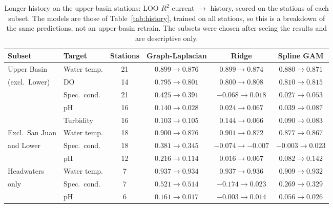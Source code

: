 \documentclass[11pt]{article}
\begin{document}
\begin{table}[h]
\centering
\small
\caption{Longer history on the upper-basin stations: LOO $R^2$ current $\to$ history, scored on the
stations of each subset. The models are those of Table~\ref{tab:history}, trained on all stations,
so this is a breakdown of the same predictions, not an upper-basin retrain. The subsets were chosen
after seeing the results and are descriptive only.}
\label{tab:history_region}
\begin{tabular}{ll c ccc}
\toprule
Subset & Target & Stations & Graph-Laplacian & Ridge & Spline GAM \\
\midrule
Upper Basin     & Water temp.  & 21 & $0.899\to0.876$ & $0.899\to0.874$ & $0.880\to0.871$ \\
(excl.\ Lower)  & DO           & 14 & $0.795\to0.801$ & $0.800\to0.808$ & $0.810\to0.815$ \\
                & Spec.\ cond. & 21 & $\mathbf{0.425\to0.391}$ & $-0.068\to0.018$ & $0.027\to0.053$ \\
                & pH           & 16 & $0.140\to0.028$ & $0.024\to0.067$ & $0.039\to0.087$ \\
                & Turbidity    & 16 & $0.103\to0.105$ & $0.144\to0.066$ & $0.090\to0.083$ \\
\addlinespace
Excl.\ San Juan & Water temp.  & 18 & $0.900\to0.876$ & $0.901\to0.872$ & $0.877\to0.867$ \\
and Lower       & Spec.\ cond. & 18 & $\mathbf{0.381\to0.345}$ & $-0.074\to-0.007$ & $-0.003\to0.023$ \\
                & pH           & 12 & $0.216\to0.114$ & $0.016\to0.067$ & $0.082\to0.142$ \\
\addlinespace
Headwaters      & Water temp.  &  7 & $0.937\to0.934$ & $0.937\to0.936$ & $0.909\to0.932$ \\
only            & Spec.\ cond. &  7 & $\mathbf{0.521\to0.514}$ & $-0.174\to0.023$ & $0.269\to0.329$ \\
                & pH           &  6 & $0.161\to0.017$ & $-0.003\to0.014$ & $0.056\to0.026$ \\
\bottomrule
\end{tabular}
\end{table}
\end{document}
